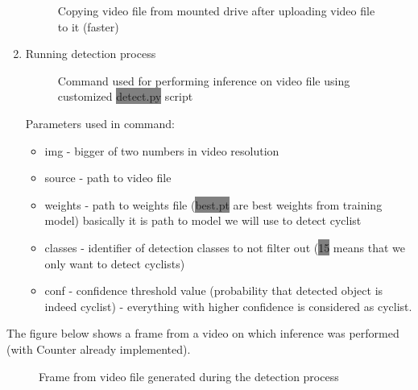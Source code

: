 \begin{enumerate}
\begin{figure} [h]
        \caption{Copying video file from mounted drive after uploading video file to it (faster)}
        \label{fig:inference3}
    \end{figure}
    \item Running detection process
    \newline \begin{figure} [h]
        \centering
        \caption{Command used for performing inference on video file using customized \colorbox{Gray}{detect.py} script}
        \label{fig:inference4}
    \end{figure}
    \newline Parameters used in command:
    \begin{itemize}
        \item img - bigger of two numbers in video resolution
        \item source - path to video file
        \item weights - path to weights file (\colorbox{Gray}{best.pt} are best weights from training model) basically it is path to model we will use to detect cyclist
        \item classes - identifier of detection classes to not filter out (\colorbox{Gray}{15} means that we only want to detect cyclists)
        \item conf - confidence threshold value (probability that detected object is indeed cyclist) - everything with higher confidence is considered as cyclist.
    \end{itemize}
\end{enumerate}
The figure below shows a frame from a video on which inference was performed (with Counter already implemented).
\begin{figure} [h]
    \centering
    \caption{Frame from video file generated during the detection process}
    \label{fig:inference}
\end{figure}
